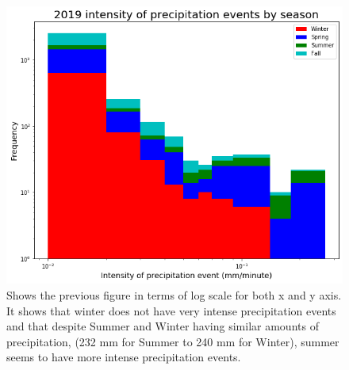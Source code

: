 \begin{figure}[h]
\centering
\includegraphics[width=150mm]{../Figures/inten1mm_season_19_log.png}
\caption{\label{abcl}Shows the previous figure in terms of log scale for both x
and y axis. It shows that winter does not have very intense
precipitation events and that despite Summer and Winter having similar
amounts of precipitation, (232 mm for Summer to 240 mm for Winter),
summer seems to have more intense precipitation events.}
\end{figure}
%
